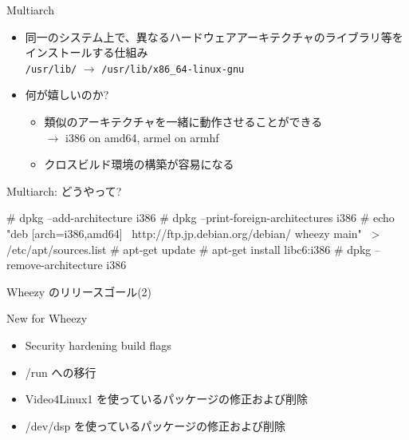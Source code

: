 \documentclass[cjk,dvipdfmx,12pt,compress,%
hyperref={bookmarks=true,bookmarksnumbered=true,bookmarksopen=false,%
  colorlinks=false,%
  pdftitle={第 66 回 関西 Debian 勉強会@KOF2012},%
  pdfauthor={佐々木洋平},%
  pdfsubject={資料},%
}]{beamer}
\begin{document}
\begin{frame}{Multiarch}

\begin{itemize}
  \item 同一のシステム上で、異なるハードウェアアーキテクチャのライブラリ等をインストールする仕組み\\
    \texttt{/usr/lib/} $\rightarrow$ \texttt{/usr/lib/x86\_64-linux-gnu} \\
  \item 何が嬉しいのか?
  \begin{itemize}
    \item 類似のアーキテクチャを一緒に動作させることができる\\
    $\rightarrow$ i386 on amd64, armel on armhf \\
    \item クロスビルド環境の構築が容易になる
  \end{itemize}
\end{itemize}

\end{frame}

\begin{frame}[containsverbatim]{Multiarch: どうやって?}

\begin{commandline}
# dpkg --add-architecture i386
# dpkg --print-foreign-architectures
i386
# echo "deb [arch=i386,amd64] \
  http://ftp.jp.debian.org/debian/ wheezy main" \
   > /etc/apt/sources.list
# apt-get update
# apt-get install libc6:i386
# dpkg --remove-architecture i386
\end{commandline}

\end{frame}


\begin{frame}{Wheezy のリリースゴール(2)}

  New for Wheezy
  \begin{itemize}
  \item Security hardening build flags
  \item /run への移行
  \item Video4Linux1 を使っているパッケージの修正および削除
  \item /dev/dsp を使っているパッケージの修正および削除
  \end{itemize}

\end{frame}
\end{document}
